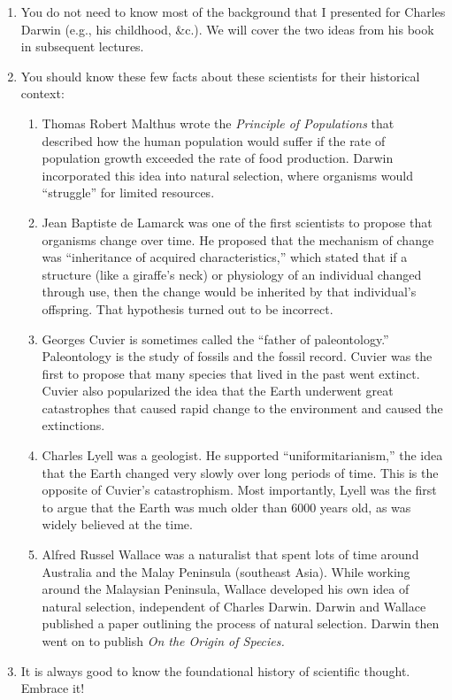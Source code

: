\documentclass[letterpaper]{tufte-handout}
\begin{document}
\begin{enumerate}

	\item You do not need to know most of the background that I presented for Charles Darwin (e.g., his childhood, \&c.). We will cover the two ideas from his book in subsequent lectures.
	
	\item You should know these few facts about these scientists for their historical context:

	\begin{enumerate}[label=\alph*.]

	\item Thomas Robert Malthus wrote the \textit{Principle of Populations} that described how the human population would suffer if the rate of population growth exceeded the rate of food production. Darwin incorporated this idea into natural selection, where organisms would “struggle” for limited resources. 
	
	\item Jean Baptiste de Lamarck was one of the first scientists to propose that organisms change over time. He proposed that the mechanism of change was “inheritance of acquired characteristics,” which stated that if a structure (like a giraffe's neck) or physiology of an individual changed through use, then the change would be inherited by that individual's offspring. That hypothesis turned out to be incorrect.

	\item Georges Cuvier is sometimes called the “father of paleontology.” Paleontology is the study of fossils and the fossil record. Cuvier was the first to propose that many species that lived in the past went extinct. Cuvier also popularized the idea that the Earth underwent great catastrophes that caused rapid change to the environment and caused the extinctions.

	\item Charles Lyell was a geologist. He supported ``uniformitarianism,'' the idea that the Earth changed very slowly over long periods of time. This is the opposite of Cuvier's catastrophism. Most importantly, Lyell was the first to argue that the Earth was much older than 6000 years old, as was widely believed at the time.

	\item Alfred Russel Wallace was a naturalist that spent lots of time around Australia and the Malay Peninsula (southeast Asia). While working around the Malaysian Peninsula, Wallace developed his own idea of natural selection, independent of Charles Darwin.  Darwin and Wallace published a paper outlining the process of natural selection. Darwin then went on to publish \textit{On the Origin of Species.}

	\end{enumerate}
	
	\item It is always good to know the foundational history of scientific thought. Embrace it!

\end{enumerate}
\end{document}
